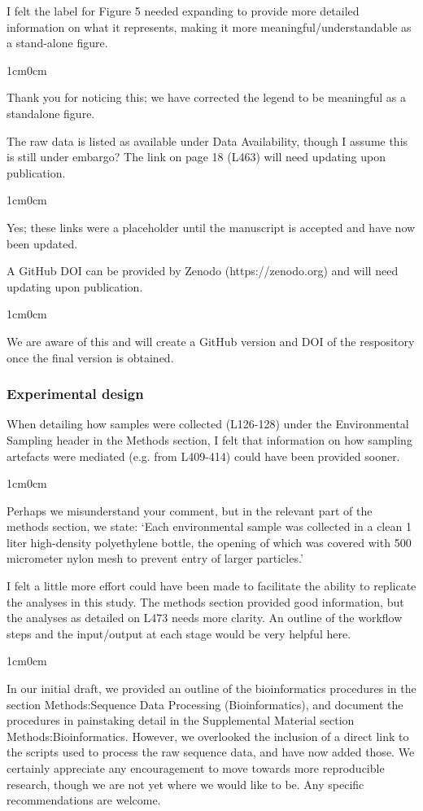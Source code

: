 \documentclass{article}
\newenvironment{response}
	{
	\begin{adjustwidth}{1cm}{0cm}
	\color{peerjBlue}
	}
	{
	\end{adjustwidth}
	}
\begin{document}
I felt the label for Figure 5 needed expanding to provide more detailed information on what it represents, making it more meaningful/understandable as a stand-alone figure.
\begin{response}
  Thank you for noticing this; we have corrected the legend to be meaningful as a standalone figure.\\
\end{response}

The raw data is listed as available under Data Availability, though I assume this is still under embargo? The link on page 18 (L463) will need updating upon publication.
\begin{response}
  Yes; these links were a placeholder until the manuscript is accepted and have now been updated.\\
\end{response}

A GitHub DOI can be provided by Zenodo (https://zenodo.org) and will need updating upon publication.
\begin{response}
  We are aware of this and will create a GitHub version and DOI of the respository once the final version is obtained.\\
\end{response}

\subsubsection*{Experimental design}
When detailing how samples were collected (L126-128) under the Environmental Sampling header in the Methods section, I felt that information on how sampling artefacts were mediated (e.g. from L409-414) could have been provided sooner.
\begin{response}
  Perhaps we misunderstand your comment, but in the relevant part of the methods section, we state: `Each environmental sample was collected in a clean 1 liter high-density polyethylene bottle, the opening of which was covered with 500 micrometer nylon mesh to prevent entry of larger particles.'\\
\end{response}

I felt a little more effort could have been made to facilitate the ability to replicate the analyses in this study. The methods section provided good information, but the analyses as detailed on L473 needs more clarity. An outline of the workflow steps and the input/output at each stage would be very helpful here.
\begin{response}
  In our initial draft, we provided an outline of the bioinformatics procedures in the section Methods:Sequence Data Processing (Bioinformatics), and document the procedures in painstaking detail in the Supplemental Material section Methods:Bioinformatics.
	However, we overlooked the inclusion of a direct link to the scripts used to process the raw sequence data, and have now added those.
	We certainly appreciate any encouragement to move towards more reproducible research, though we are not yet where we would like to be.
	Any specific recommendations are welcome.
	\\
\end{response}
\end{document}
